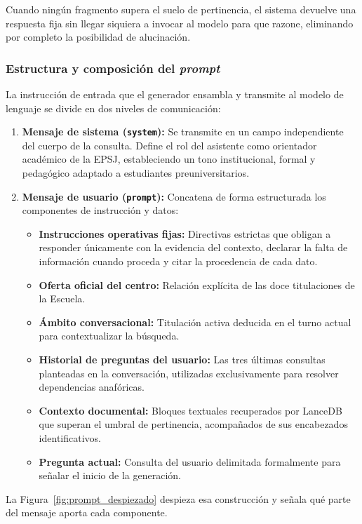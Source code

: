 Cuando ningún fragmento supera el suelo de pertinencia, el sistema devuelve una respuesta fija sin llegar siquiera a invocar al modelo para que razone, eliminando por completo la posibilidad de alucinación.


\subsubsection{Estructura y composición del \textit{prompt}}

La instrucción de entrada que el generador ensambla y transmite al modelo de lenguaje se divide en dos niveles de comunicación:

\begin{enumerate}
  \item \textbf{Mensaje de sistema (\texttt{system}):} Se transmite en un campo independiente del cuerpo de la consulta. Define el rol del asistente como orientador académico de la EPSJ, estableciendo un tono institucional, formal y pedagógico adaptado a estudiantes preuniversitarios.
  \item \textbf{Mensaje de usuario (\texttt{prompt}):} Concatena de forma estructurada los componentes de instrucción y datos:
  \begin{itemize}
    \item \textbf{Instrucciones operativas fijas:} Directivas estrictas que obligan a responder únicamente con la evidencia del contexto, declarar la falta de información cuando proceda y citar la procedencia de cada dato.
    \item \textbf{Oferta oficial del centro:} Relación explícita de las doce titulaciones de la Escuela.
    \item \textbf{Ámbito conversacional:} Titulación activa deducida en el turno actual para contextualizar la búsqueda.
    \item \textbf{Historial de preguntas del usuario:} Las tres últimas consultas planteadas en la conversación, utilizadas exclusivamente para resolver dependencias anafóricas.
    \item \textbf{Contexto documental:} Bloques textuales recuperados por LanceDB que superan el umbral de pertinencia, acompañados de sus encabezados identificativos.
    \item \textbf{Pregunta actual:} Consulta del usuario delimitada formalmente para señalar el inicio de la generación.
  \end{itemize}
\end{enumerate}

La Figura~\ref{fig:prompt_despiezado} despieza esa construcción y señala qué parte del mensaje aporta cada componente.

